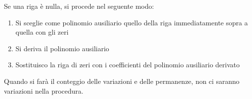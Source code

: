 Se una riga \`e nulla, si procede nel seguente modo:

\begin{enumerate}
  \item Si sceglie come polinomio ausiliario quello della riga immediatamente sopra a quella con gli zeri
  \item Si deriva il polinomio ausiliario
  \item Sostituisco la riga di zeri con i coefficienti del polinomio ausiliario derivato
\end{enumerate}

Quando si far\`a il conteggio delle variazioni e delle permanenze, non ci saranno variazioni nella procedura.



